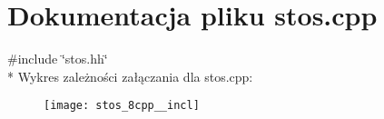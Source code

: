 \section{Dokumentacja pliku stos.\+cpp}
\label{stos_8cpp}
{\ttfamily \#include \char`\"{}stos.\+hh\char`\"{}}\\*
Wykres zależności załączania dla stos.\+cpp\+:\nopagebreak
\begin{figure}[H]
\begin{center}
\leavevmode
\texttt{[image: stos\_8cpp\_\_incl]}
\end{center}
\end{figure}
